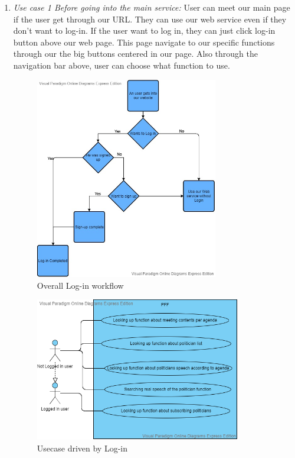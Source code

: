 \documentclass[conference]{IEEEtran}
\begin{document}
\begin{enumerate}

\item \textit {Use case 1 Before going into the main service: } User can meet our main page if the user get through our URL. They can use our web service even if they don’t want to log-in. If the user want to log in, they can just click log-in button above our web page. This page navigate to our specific functions  through our the big buttons centered in our page. Also through the navigation bar above, user can choose what function to use.
 \\
 
  \begin{figure}[htbp]
\centerline{\includegraphics[width=80mm,scale=0.5]{fig/usecase1.jpg}}
\caption{Overall Log-in workflow}
\label{fig}
\end{figure}
 
 \begin{figure}[htbp]
\centerline{\includegraphics[width=90mm,scale=0.5]{fig/usecase2.png}}
\caption{Usecase driven by Log-in}
\label{fig}
\end{figure}


\end{enumerate}
\end{document}
